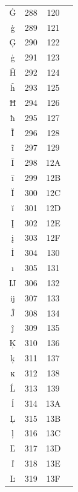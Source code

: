 ﻿\documentclass[10pt]{article}
\begin{document}
\begin{tabular}{crcl}
Ġ&288&120&\\
ġ&289&121&\\
Ģ&290&122&\\
ģ&291&123&\\
Ĥ&292&124&\\
ĥ&293&125&\\
Ħ&294&126&\\
ħ&295&127&\\
Ĩ&296&128&\\
ĩ&297&129&\\
Ī&298&12A&\\
ī&299&12B&\\
Ĭ&300&12C&\\
ĭ&301&12D&\\
Į&302&12E&\\
į&303&12F&\\
İ&304&130&\\
ı&305&131&\\
Ĳ&306&132&\\
ĳ&307&133&\\
Ĵ&308&134&\\
ĵ&309&135&\\
Ķ&310&136&\\
ķ&311&137&\\
ĸ&312&138&\\
Ĺ&313&139&\\
ĺ&314&13A&\\
Ļ&315&13B&\\
ļ&316&13C&\\
Ľ&317&13D&\\
ľ&318&13E&\\
Ŀ&319&13F&\\
\end{tabular}
\end{document}
